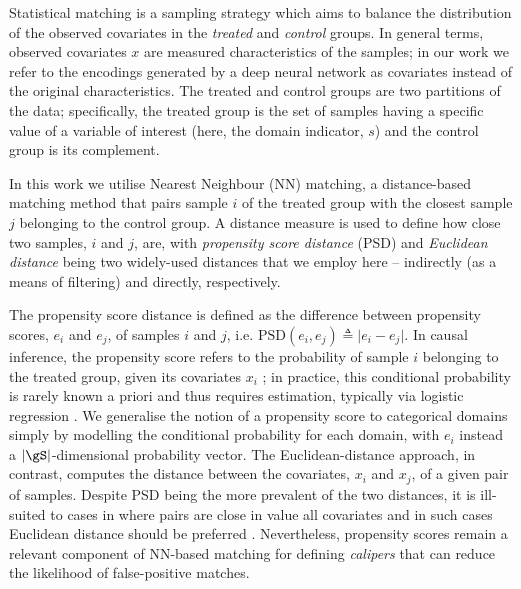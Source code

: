 Statistical matching is a sampling strategy which aims to balance the distribution of the observed
covariates in the \emph{treated} and \emph{control} groups. In general terms, observed covariates
$x$ are measured characteristics of the samples; in our work we refer to the encodings generated by
a deep neural network as covariates instead of the original characteristics. 
%
The treated and control groups are two partitions of the data; specifically, the treated group is
the set of samples having a specific value of a variable of interest (here, the domain indicator,
$s$) and the control group is its complement.

In this work we utilise Nearest Neighbour (NN) matching, a distance-based matching method that pairs
sample $i$ of the treated group with the closest sample $j$ belonging to the control group.
%
A distance measure is used to define how close two samples, $i$ and $j$, are, with \emph{propensity
score distance} (PSD) and \emph{Euclidean distance} being two widely-used distances that we employ
here
-- indirectly (as a means of filtering) and directly, respectively.

The propensity score distance is defined as the difference between propensity scores, $e_i$
and $e_j$, of samples $i$ and $j$, i.e. \( \mathrm{PSD}(e_i, e_j) \triangleq \vert e_i - e_j \vert \). 
%
In causal inference, the propensity score refers to the probability of sample $i$ belonging to the
treated group, given its covariates $x_i$ \citep{rosenbaum1983central}; in practice, this
conditional probability is rarely known a priori and thus requires estimation, typically via
logistic regression \citep{stuart2010matching}. 
%
We generalise the notion of a propensity score to categorical domains simply by modelling the
conditional probability for each domain, with  $e_i$ instead a \( |\gS| \)-dimensional probability
vector.
%
The Euclidean-distance approach, in contrast, computes the distance between the covariates,
$x_i$ and $x_j$, of a given pair of samples.
%
Despite PSD being the more prevalent of the two distances, it is ill-suited to cases in where pairs
are close in value \wrt{} all covariates and in such cases Euclidean distance should be preferred
\citep{king2019propensity}. 
%
Nevertheless, propensity scores remain a relevant component of NN-based matching for defining
\emph{calipers} that can reduce the likelihood of false-positive matches.
%


